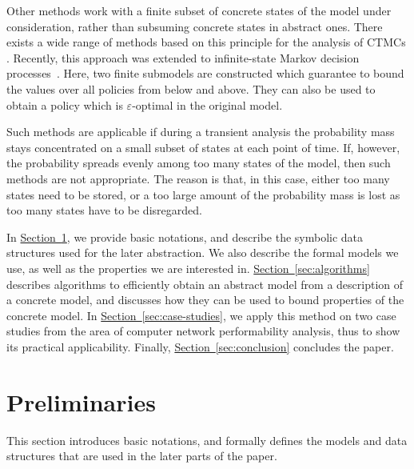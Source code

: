 \documentclass[10pt,twocolumn]{article}
\newcommand{\refsec}[1]{\texorpdfstring{\hyperref[sec:#1]{Section~\ref*{sec:#1}}}{Section~\ref*{sec:#1}}}
\begin{document}
Other methods work with a finite subset of concrete states of the
model under consideration, rather than subsuming concrete states in
abstract ones. There exists a wide range of methods based on this principle
for the analysis of CTMCs \cite{Grassmann91,MoorselS94,MunskyK06,HenzingerMW09}.
Recently, this approach was extended to infinite-state Markov decision processes~\cite{Buchholz12}.
Here, two finite submodels are constructed which guarantee to bound the
values over all policies from below and above. They can also be used
to obtain a policy which is $\varepsilon$-optimal in the original model.

Such methods are applicable if during a transient analysis the
probability mass stays concentrated on a small subset of states at
each point of time.  If, however, the probability spreads evenly among
too many states of the model, then such methods are not appropriate. The
reason is that, in this case, either too many states need to be stored, 
or a too large amount of the probability mass is lost as too many
states have to be disregarded.

In \refsec{preliminaries}, we
provide basic notations, and describe the symbolic data structures used
for the later abstraction. We also describe the formal models we use,
as well as the properties we are interested in. \refsec{algorithms}
describes algorithms to efficiently obtain an abstract model from a
description of a concrete model, and discusses how they can be used to
bound properties of the concrete model. In \refsec{case-studies}, we
apply this method on two case studies from the area of computer network
performability analysis, thus to show its practical applicability. Finally,
\refsec{conclusion} concludes the paper.

\section{Preliminaries}
\label{sec:preliminaries}
\noindent This section introduces basic notations, and formally defines the
models and data structures that are used in the later parts of the
paper.
\end{document}
